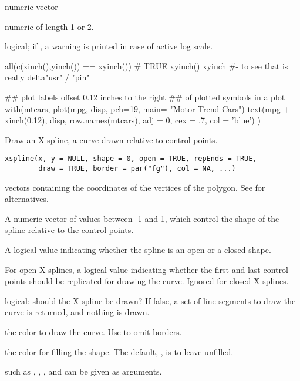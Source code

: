 %
\begin{Arguments}
\begin{ldescription}
\item[\code{x,y}] numeric vector
\item[\code{xy}] numeric of length 1 or 2.
\item[\code{warn.log}] logical; if , a warning is printed in case
of active log scale.
\end{ldescription}
\end{Arguments}
%
\begin{Examples}
\begin{ExampleCode}
all(c(xinch(),yinch()) == xyinch()) # TRUE
xyinch()
xyinch #- to see that is really   delta{"usr"} / "pin"

## plot labels offset 0.12 inches to the right
## of plotted symbols in a plot
with(mtcars, {
    plot(mpg, disp, pch=19, main= "Motor Trend Cars")
    text(mpg + xinch(0.12), disp, row.names(mtcars),
         adj = 0, cex = .7, col = 'blue')
    })
\end{ExampleCode}
\end{Examples}
%
\begin{Description}\relax
Draw an X-spline, a curve drawn relative to control points.
\end{Description}
%
\begin{Usage}
\begin{verbatim}
xspline(x, y = NULL, shape = 0, open = TRUE, repEnds = TRUE,
        draw = TRUE, border = par("fg"), col = NA, ...)
\end{verbatim}
\end{Usage}
%
\begin{Arguments}
\begin{ldescription}
\item[\code{x,y}] vectors containing the coordinates of the vertices
of the polygon. See  for alternatives.
\item[\code{shape}] A numeric vector of values between -1 and 1, which
control the shape of the spline relative to the control points.
\item[\code{open}] A logical value indicating whether the spline is
an open or a closed shape.
\item[\code{repEnds}] For open X-splines, a logical value indicating whether
the first and last control points should be replicated for drawing
the curve. Ignored for closed X-splines.
\item[\code{draw}] logical: should the X-spline be drawn?  If false, a set of
line segments to draw the curve is returned, and nothing is drawn.
\item[\code{border}] the color to draw the curve.   Use  to
omit borders.
\item[\code{col}] the color for filling the shape. The default,
, is to leave unfilled.
\item[\code{...}]  such as , ,
,  and  can be given as arguments.
\end{ldescription}
\end{Arguments}
